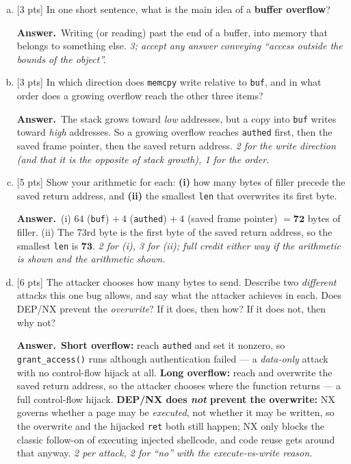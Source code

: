 \documentclass[11pt]{article}
\newcommand{\answer}[1]{\begin{ansbox}{\bfseries Answer.}\ #1\end{ansbox}}
\newcommand{\answer}[1]{}
\newcommand{\pts}[1]{\textcolor{muted}{\small[#1 pts]}}
\begin{document}
    \begin{enumerate}[(a)]
        \item \pts{3} In one short sentence, what is the main idea of a \textbf{buffer overflow}?
        \answer{Writing (or reading) past the end of a buffer, into memory that belongs to something else. \emph{3; accept any answer conveying ``access outside the bounds of the object''.}}

        
        \item \pts{3} In which direction does \texttt{memcpy} write relative to \texttt{buf}, and in what order does a growing overflow reach the other three items?
        \answer{The stack grows toward \emph{low} addresses, but a copy into \texttt{buf} writes toward \emph{high} addresses. So a growing overflow reaches \texttt{authed} first, then the saved frame pointer, then the saved return address. \emph{2 for the write direction (and that it is the opposite of stack growth), 1 for the order.}}

        \item \pts{5} Show your arithmetic for each: \textbf{(i)} how many bytes of filler precede the saved return address, and \textbf{(ii)} the smallest \texttt{len} that overwrites its first byte.
        \answer{(i) $64$ (\texttt{buf}) $+\ 4$ (\texttt{authed}) $+\ 4$ (saved frame pointer) $=\mathbf{72}$ bytes of filler. (ii) The 73rd byte is the first byte of the saved return address, so the smallest \texttt{len} is $\mathbf{73}$. \emph{2 for (i), 3 for (ii); full credit either way if the arithmetic is shown and the arithmetic shown.}}

        \item \pts{6} The attacker chooses how many bytes to send. Describe two \emph{different} attacks this one bug allows, and say what the attacker achieves in each. Does DEP/NX prevent the \emph{overwrite}? If it does, then how? If it does not, then why not?
        \answer{\textbf{Short overflow:} reach \texttt{authed} and set it nonzero, so \texttt{grant\_access()} runs although authentication failed --- a \emph{data-only} attack with no control-flow hijack at all. \textbf{Long overflow:} reach and overwrite the saved return address, so the attacker chooses where the function returns --- a full control-flow hijack. \textbf{DEP/NX does \emph{not} prevent the overwrite:} NX governs whether a page may be \emph{executed}, not whether it may be written, so the overwrite and the hijacked \texttt{ret} both still happen; NX only blocks the classic follow-on of executing injected shellcode, and code reuse gets around that anyway. \emph{2 per attack, 2 for ``no'' with the execute-vs-write reason.}}


\end{enumerate}
\end{document}
